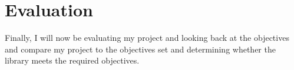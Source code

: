 \chapter{Evaluation}
Finally, I will now be evaluating my project and looking back at the objectives and compare my project to the objectives set and determining whether the library meets the required objectives.




